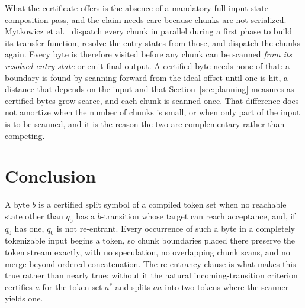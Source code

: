 \documentclass[11pt,a4paper]{article}
\theoremstyle{definition}
\theoremstyle{plain}
\begin{document}
What the certificate offers is the absence of a mandatory full-input state-composition pass, and the claim needs care
because chunks are not serialized. Mytkowicz et al.~\cite{mytkowicz2014dpfsm} dispatch every chunk in parallel during
a first phase to build its transfer function, resolve the entry states from those, and dispatch the chunks again.
Every byte is therefore visited before any chunk can be scanned \emph{from its resolved entry state} or emit final
output. A certified byte needs none of that: a boundary is found by scanning forward from the ideal offset until one
is hit, a distance that depends on the input and that Section~\ref{sec:planning} measures as certified bytes grow
scarce, and each chunk is scanned once. That difference does not amortize when the number of chunks is small, or when
only part of the input is to be scanned, and it is the reason the two are complementary rather than competing.

\section{Conclusion}

A byte $b$ is a certified split symbol of a compiled token set when no reachable state other than $q_0$ has a
$b$-transition whose target can reach acceptance, and, if $q_0$ has one, $q_0$ is not re-entrant. Every occurrence of
such a byte in a completely tokenizable input begins a token, so chunk boundaries placed there preserve the token
stream exactly, with no speculation, no overlapping chunk scans, and no merge beyond ordered concatenation. The
re-entrancy clause is what makes this true rather than nearly true: without it the natural incoming-transition
criterion certifies $a$ for the token set $a^*$ and splits $aa$ into two tokens where the scanner yields one.
\end{document}
